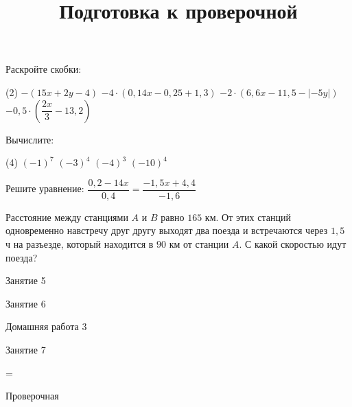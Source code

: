 \begin{homework}[number=2]
	\begin{listofex}
		\item Раскройте скобки:
		\begin{tasks}(2)
			\task \( -(15x+2y-4) \)
			\task \( -4 \cdot (0,14x-0,25+1,3) \)
			\task \( -2 \cdot(6,6x-11,5 -|-5y|) \)
			\task \( -0,5 \cdot \left( \dfrac{ 2x }{ 3 }-13,2 \right) \)
		\end{tasks}
		\item Вычислите:
		\begin{tasks}(4)
			\task \( (-1)^7 \)
			\task \( (-3)^{4} \)
			\task \( (-4)^3 \)
			\task \( (-10)^{4} \)
		\end{tasks}
		\item Решите уравнение: \( \dfrac{ 0,2-14x }{ 0,4 }=\dfrac{ -1,5x+4,4 }{ -1,6 } \)
		\item Расстояние между станциями \(A\) и \(B\) равно \(165\) км. От этих станций одновременно навстречу друг другу выходят два поезда и встречаются через \(1,5\) ч на разъезде, который находится в \(90\) км от станции \(A\). С какой скоростью идут поезда?
	\end{listofex}
\end{homework}

\begin{class}[number=5]
	\begin{listofex}
		\item Занятие 5
	\end{listofex}
\end{class}

\begin{class}[number=6]
	\begin{listofex}
		\item Занятие 6
	\end{listofex}
\end{class}

\begin{homework}[number=3]
	\begin{listofex}
		\item Домашняя работа 3
	\end{listofex}
\end{homework}

\begin{class}[number=7]
	\title{Подготовка к проверочной}
	\begin{listofex}
		\item Занятие 7
	\end{listofex}
\end{class}

=%
\begin{exam}
	\begin{listofex}
		\item Проверочная
	\end{listofex}
\end{exam}
